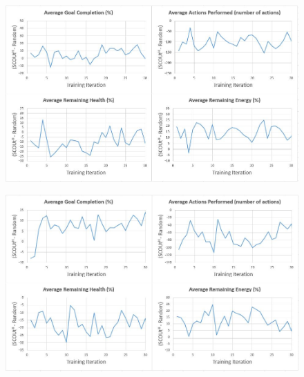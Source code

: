 \begin{appxfig}[H]
\begin{figure}[H]
  \includegraphics[width=0.9\columnwidth]{Figures/Results/TrainingVariation1/Hybrid-FindHuman.JPG}
\end{figure}
\caption{Iteration testing performance results for $SCOUt_{H}$ attempting \textit{Find Human} using setup variation 1 (see subsection~\ref{subsec:training_variations}). All graphs show the controller's average difference in performance compared to $Random$ ($SCOUt_{H}$ average - $Random$ average) VS the number of training iterations completed.}
\label{appendix:hybrid_training_fh_variation1}
\end{appxfig}


\begin{appxfig}[H]
\begin{figure}[H]
  \includegraphics[width=0.9\columnwidth]{Figures/Results/TrainingVariation1/Hybrid-MapWater.JPG}
\end{figure}
\caption{Iteration testing performance results for $SCOUt_{H}$ attempting \textit{Map Water} using setup variation 1 (see subsection~\ref{subsec:training_variations}). All graphs show the controller's average difference in performance compared to $Random$ ($SCOUt_{H}$ average - $Random$ average) VS the number of training iterations completed.}
\label{appendix:hybrid_training_mw_variation1}
\end{appxfig}







